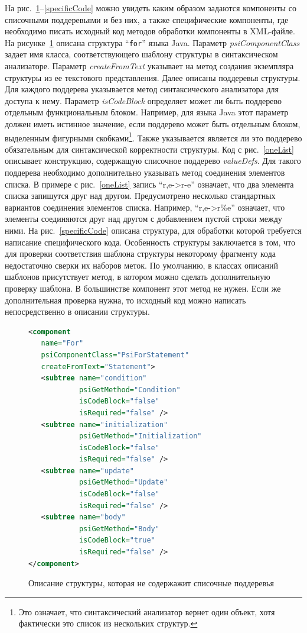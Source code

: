 На рис.~\ref{noLists}--\ref{specificCode} можно увидеть каким образом задаются компоненты со списочными поддеревьями и без них, а также специфические компоненты, где необходимо писать исходный код методов обработки компоненты в XML-файле. На рисунке~\ref{noLists} описана структура ``\lstinline{for}'' языка Java. Параметр \textit{psiComponentClass} задает имя класса, соответствующего шаблону структуры в синтаксическом анализаторе. Параметр \textit{createFromText} указывает на метод создания экземпляра структуры из ее текстового представления. Далее описаны поддеревья структуры. Для каждого поддерева указывается метод синтаксического анализатора для доступа к нему. Параметр \textit{isCodeBlock} определяет может ли быть поддерево отдельным функциональным блоком. Например, для языка Java этот параметр должен иметь истинное значение, если поддерево может быть отдельным блоком, выделенным фигурными скобками\footnote{Это означает, что синтаксический анализатор вернет один объект, хотя фактически это список из нескольких структур.}. Также указывается является ли это поддерево обязательным для синтаксической корректности структуры. Код с рис.~\ref{oneList} описывает конструкцию, содержащую списочное поддерево \textit{valueDefs}. Для такого поддерева необходимо дополнительно указывать метод соединения элементов списка. В примере с рис.~\ref{oneList} запись ``r,e->r-e'' означает, что два элемента списка запишутся друг над другом. Предусмотрено несколько стандартных вариантов соединения элементов списка. Например, ``r,e->r\%e'' означает, что элементы соединяются друг над другом с добавлением пустой строки между ними. На рис.~\ref{specificCode} описана структура, для обработки которой требуется написание специфического кода. Особенность структуры заключается в том, что для проверки соответствия шаблона структуры некоторому фрагменту кода недостаточно сверки их наборов меток. По умолчанию, в классах описаний шаблонов присутствует метод, в котором можно сделать дополнительную проверку шаблона. В большинстве компонент этот метод не нужен. Если же дополнительная проверка нужна, то исходный код можно написать непосредственно в описании структуры.

\begin{figure}[H]
    \begin{lstlisting}[language=xml,basicstyle=\scriptsize]
<component 
   name="For"
   psiComponentClass="PsiForStatement" 
   createFromText="Statement">
   <subtree name="condition"       
            psiGetMethod="Condition"
            isCodeBlock="false"    
            isRequired="false" />
   <subtree name="initialization"  
            psiGetMethod="Initialization"
            isCodeBlock="false"    
            isRequired="false" />
   <subtree name="update"          
            psiGetMethod="Update"
            isCodeBlock="false"    
            isRequired="false" />
   <subtree name="body"            
            psiGetMethod="Body"
            isCodeBlock="true"     
            isRequired="false" />
</component>
    \end{lstlisting}
\caption{Описание структуры, которая не содержажит списочные поддеревья}    
\label{noLists}
\end{figure}

